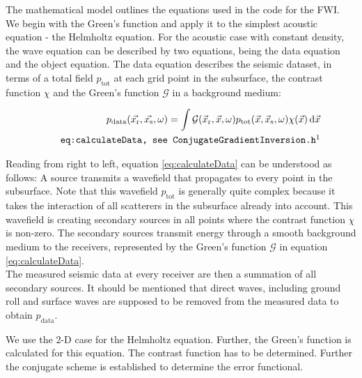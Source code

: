\documentclass[10pt,a4paper]{article}
\newcommand{\df}[1]{\, \ensuremath{\mbox{d}#1}}
\newcommand{\xs}{\vec{x}_\text{s}}
\newcommand{\xr}{\vec{x}_\text{r}}
\newcommand{\x}{\vec{x}}
\begin{document}
The mathematical model outlines the equations used in the code for the FWI.
We begin with the Green's function and apply it to the
simplest acoustic equation - the Helmholtz equation.
For the acoustic case with constant density, the wave equation can be
described by two equations,
being the data equation and the object equation. The data equation
describes the seismic dataset, in terms of a total field
$p_{\text{tot}}$ at each grid point in the subsurface, the contrast
function $\chi$ and the Green's function $\mathcal{G}$
in a background medium: 

\begin{align}
\label{eq:calculateData}
p_\text{data}(\vec{x_\text{r}},\vec{x_\text{s}},\omega) = \int
\mathcal{G}(\xr, \x, \omega) p_\text{tot}(\x, \xs, \omega) \chi(\x)
\df{\x}\\
\tag*{\texttt{eq:calculateData, see ConjugateGradientInversion.h\footnotemark}}
\end{align}

Reading from right to left, equation \ref{eq:calculateData} can be understood as
follows: A source transmits a wavefield that propagates to every point
in the subsurface. Note that this wavefield $p_\text{tot}$ is
generally quite complex because it takes the interaction of all
scatterers in the subsurface already into account. This wavefield is
creating secondary sources in all points where the contrast function
$\chi$ is non-zero. The secondary sources transmit energy through a
smooth background medium to the receivers, represented by the Green's
function $\mathcal{G}$ in equation \ref{eq:calculateData}.\\ %
The measured seismic data at every receiver are then a summation of
all secondary sources. It should be mentioned that direct waves,
including ground roll and surface waves are supposed to be removed
from the measured data to obtain $p_\text{data}$.

We use the 2-D case for the Helmholtz equation. Further, the Green's
function is calculated for this equation. The contrast function has to
be determined. Further the conjugate scheme is established to
determine the error functional.
\end{document}
